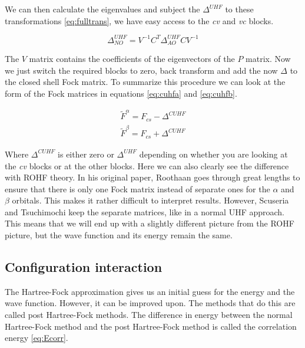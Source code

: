 \documentclass[twoside,twocolumn,9pt]{article}
\begin{document}
We can then calculate the eigenvalues and subject the $\Delta^{UHF}$ to these transformations \eqref{eq:fulltrans}, we have easy access to the \textit{cv} and \textit{vc} blocks.

\begin{equation}\label{eq:fulltrans}
  \Delta_{NO}^{UHF} = V^{-1} C^T \Delta^{UHF}_{AO} C V^{-1}
\end{equation}

The $V$ matrix contains the coefficients of the eigenvectors of the $P$ matrix. Now we just switch the required blocks to zero, back transform and add the now $\Delta$ to the closed
shell Fock matrix. To summarize this procedure we can look at the form of the Fock matrices in equations \eqref{eq:cuhfa} and \eqref{eq:cuhfb}.

\begin{subequations}
  \begin{align}
    \label{eq:cuhfa}
    \tilde{F}^\alpha = F_{cs} - \Delta^{CUHF} \\
    \label{eq:cuhfb}
    \tilde{F}^\beta = F_{cs} + \Delta^{CUHF}
  \end{align}
\end{subequations}

Where $\Delta^{CUHF}$ is either zero or $\Delta^{UHF}$ depending on whether you are looking at the \textit{cv} blocks or at the other blocks. Here we can also clearly see the
difference with ROHF theory. In his original paper, Roothaan goes through great lengths to ensure that there is only one Fock matrix instead of separate ones for the $\alpha$ and
$\beta$ orbitals\cite{Roothaan1960}. This makes it rather difficult to interpret results\cite{Scuseria2010}. However, Scuseria and Tsuchimochi keep the separate matrices, like in a
normal UHF approach. This means that we will end up with a slightly different picture from the ROHF picture, but the wave function and its energy remain the same\cite{Scuseria2010}.

\subsection{Configuration interaction}
\label{subsec:cistheory}

The Hartree-Fock approximation gives us an initial guess for the energy and the wave function. However, it can be improved upon. The methods that do this are called post Hartree-Fock
methods. The difference in energy between the normal Hartree-Fock method and the post Hartree-Fock method is called the correlation energy \eqref{eq:Ecorr}.
\end{document}
